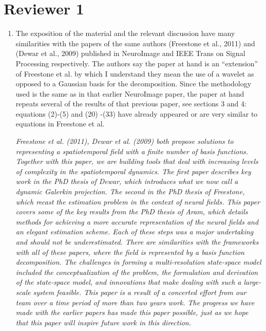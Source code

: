 \documentclass{article}
\begin{document}
\begin{enumerate}
\end{enumerate}

    \section{Reviewer 1}
    

    \begin{enumerate}
        \item The exposition of the material and the relevant discussion have many similarities with the papers of the same authors (Freestone et al., 2011) and (Dewar et al., 2009) published in NeuroImage and IEEE Trans on Signal Processing  respectively. The authors say the paper at hand is an ``extension'' of Freestone et al. by which I understand they mean the use of a wavelet as opposed to a Gaussian basis for the decomposition. Since the methodology used is the same as in that earlier NeuroImage paper, the paper at hand repeats several of  the results of that previous paper, see sections 3 and 4: equations (2)-(5) and (20) -(33) have already appeared or are very similar to equations in Freestone et al.   
								 
	\emph{Freestone et al. (2011), Dewar et al. (2009) both propose solutions to representing a spatiotemporal field with a finite number of basis functions. Together with this paper, we are building tools that deal with increasing levels of complexity in the spatiotemporal dynamics. The first paper describes key work in the PhD thesis of Dewar, which introduces what we now call a dynamic Galerkin projection. The second in the PhD thesis of Freestone, which recast the estimation problem in the context of neural fields. This paper covers some of the key results from the PhD thesis of Aram, which details methods for achieving a more accurate representation of the neural fields and an elegant estimation scheme. Each of these steps was a major undertaking and should not be underestimated. There are similarities with the frameworks with all of these papers, where the field is represented by a basis function decomposition. The challenges in forming a multi-resolution state-space model included the conceptualization of the problem, the formulation and derivation of the state-space model, and innovations that make dealing with such a large-scale system feasible. This paper is a result of a concerted effort from our team over a time period of more than two years work. The progress we have made with the earlier papers has made this paper possible, just as we hope that this paper will inspire future work in this direction.}
	        

\end{enumerate}
\end{document}
